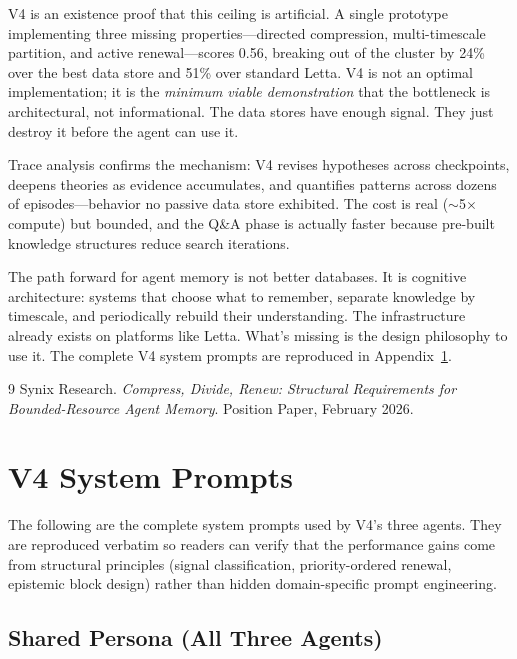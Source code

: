 \documentclass[11pt,letterpaper]{article}
\begin{document}
V4 is an existence proof that this ceiling is artificial. A single prototype implementing three missing properties---directed compression, multi-timescale partition, and active renewal---scores 0.56, breaking out of the cluster by 24\% over the best data store and 51\% over standard Letta. V4 is not an optimal implementation; it is the \emph{minimum viable demonstration} that the bottleneck is architectural, not informational. The data stores have enough signal. They just destroy it before the agent can use it.

Trace analysis confirms the mechanism: V4 revises hypotheses across checkpoints, deepens theories as evidence accumulates, and quantifies patterns across dozens of episodes---behavior no passive data store exhibited. The cost is real ($\sim$5$\times$ compute) but bounded, and the Q\&A phase is actually faster because pre-built knowledge structures reduce search iterations.

The path forward for agent memory is not better databases. It is cognitive architecture: systems that choose what to remember, separate knowledge by timescale, and periodically rebuild their understanding. The infrastructure already exists on platforms like Letta. What's missing is the design philosophy to use it. The complete V4 system prompts are reproduced in Appendix~\ref{app:prompts}.

\begin{thebibliography}{9}
Synix Research. \emph{Compress, Divide, Renew: Structural Requirements for Bounded-Resource Agent Memory}. Position Paper, February 2026.
\end{thebibliography}

\appendix
\section{V4 System Prompts}
\label{app:prompts}

The following are the complete system prompts used by V4's three agents. They are reproduced verbatim so readers can verify that the performance gains come from structural principles (signal classification, priority-ordered renewal, epistemic block design) rather than hidden domain-specific prompt engineering.

\subsection{Shared Persona (All Three Agents)}
\end{document}
